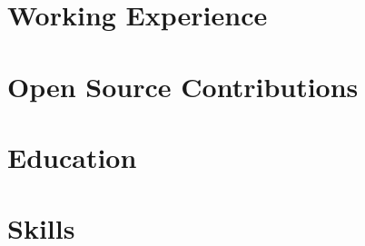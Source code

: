 \documentclass[letter,10pt]{article}
\begin{document}


\section{Working Experience}


\section{Open Source Contributions}

\section{Education}


\section{Skills}

\end{document}
